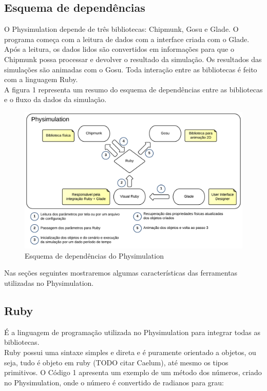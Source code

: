 \subsection{Esquema de dependências}
O Physimulation depende de três bibliotecas: Chipmunk, Gosu e Glade. O programa começa com a leitura de dados com a interface criada com o Glade. Após a leitura, 
os dados lidos são convertidos em informações para que o Chipmunk possa processar e devolver o resultado da simulação. Os resultados das simulações são animadas 
com o Gosu. Toda interação entre as bibliotecas é feito com a linguagem Ruby. \\

A figura 1 representa um resumo do esquema de dependências entre as bibliotecas e o fluxo da dados da simulação.

\begin{figure}[!htbp]
  \includegraphics[scale=0.2]{EsquemaDependencia.png}
  \caption{Esquema de dependências do Physimulation}
\end{figure}

Nas seções seguintes mostraremos algumas características das ferramentas utilizadas no Physimulation.

\subsection{Ruby}
É a linguagem de programação utilizada no Physimulation para integrar todas as bibliotecas.\\

Ruby possui uma sintaxe simples e direta e é puramente orientado a objetos, ou seja, tudo é objeto em ruby (TODO citar Caelum), até mesmo os tipos primitivos. O Código 1 apresenta um exemplo de um método dos números, criado no Physimulation, onde o 
número é convertido de radianos para grau:

